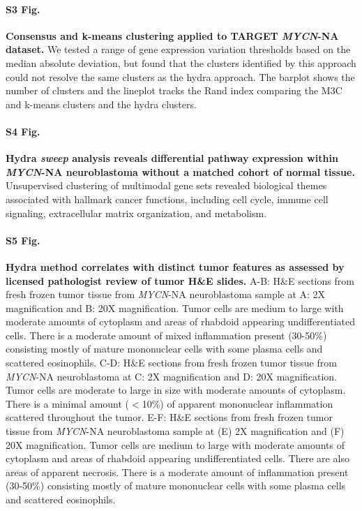 \documentclass[10pt,letterpaper]{article}
\begin{document}
\paragraph*{S3 Fig.}
\label{S3_Fig}
{\bf{Consensus and k-means clustering applied to TARGET \textit{MYCN}-NA dataset.}} We tested a range of gene expression variation thresholds based on the median absolute deviation, but found that the clusters identified by this approach could not resolve the same clusters as the hydra approach. The barplot shows the number of clusters and the lineplot tracks the Rand index comparing the M3C and k-means clusters and the hydra clusters.

\paragraph*{S4 Fig.}
\label{S4_Fig}{\bf Hydra \textit{sweep} analysis reveals differential pathway expression within \textit{MYCN}-NA neuroblastoma without a matched cohort of normal tissue.}
Unsupervised clustering of multimodal gene sets revealed biological themes associated with hallmark cancer functions, including cell cycle, immune cell signaling, extracellular matrix organization, and metabolism.

\paragraph*{S5 Fig.}
\label{S5_Fig} {\bf Hydra method correlates with distinct tumor features as assessed by licensed pathologist review of tumor H\&E slides.}
A-B: H\&E sections from fresh frozen tumor tissue from \textit{MYCN}-NA neuroblastoma sample at A: 2X magnification and B: 20X magnification. Tumor cells are medium to large with moderate amounts of cytoplasm and areas of rhabdoid appearing undifferentiated cells.  There is a moderate amount of mixed inflammation present (30-50\%) consisting mostly of mature mononuclear cells with some plasma cells and scattered eosinophils. C-D: H\&E sections from fresh frozen tumor tissue from \textit{MYCN}-NA neuroblastoma at C: 2X magnification and D: 20X magnification. Tumor cells are moderate to large in size with moderate amounts of cytoplasm. There is a minimal amount ($<$10\%) of apparent mononuclear inflammation scattered throughout the tumor. E-F: H\&E sections from fresh frozen tumor tissue from \textit{MYCN}-NA neuroblastoma sample at (E) 2X magnification and (F) 20X magnification.  Tumor cells are medium to large with moderate amounts of cytoplasm and areas of rhabdoid appearing undifferentiated cells.  There are also areas of apparent necrosis.  There is a moderate amount of inflammation present (30-50\%) consisting mostly of mature mononuclear cells with some plasma cells and scattered eosinophils.
\end{document}
